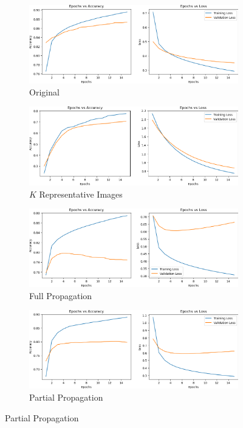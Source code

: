 \documentclass[10pt]{article}
\begin{document}
    \begin{figure}[!h]
        \centering
        \begin{subfigure}[b]{0.48\textwidth}
            \centering
            \caption{Original}
            \includegraphics[width=\textwidth]{Fashion - Model 1.png}
        \end{subfigure}
        \begin{subfigure}[b]{0.48\textwidth}
            \centering
            \caption{$K$ Representative Images}
            \includegraphics[width=\textwidth]{Fashion - Model 2.png}
        \end{subfigure}
        \begin{subfigure}[b]{0.48\textwidth}
            \centering
            \caption{Full Propagation}
            \includegraphics[width=\textwidth]{Fashion - Model 3.png}
        \end{subfigure}
        \begin{subfigure}[b]{0.48\textwidth}
            \centering
            \caption{Partial Propagation}
            \includegraphics[width=\textwidth]{Fashion - Model 4.png}
        \end{subfigure}
    \end{figure}
\end{document}
